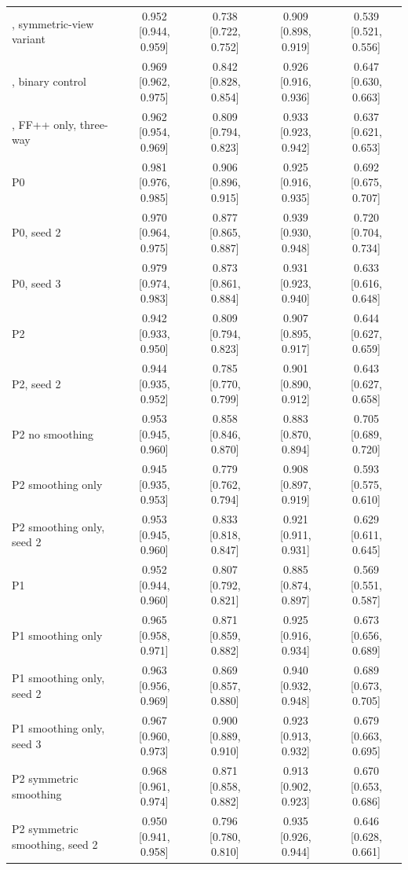 \begin{tabular}{@{}l cccc@{}}
\ours{}, symmetric-view variant & 0.952 [0.944, 0.959] & 0.738 [0.722, 0.752] & 0.909 [0.898, 0.919] & 0.539 [0.521, 0.556] \\
\ours{}, binary control & 0.969 [0.962, 0.975] & 0.842 [0.828, 0.854] & 0.926 [0.916, 0.936] & 0.647 [0.630, 0.663] \\
\ours{}, FF++ only, three-way & 0.962 [0.954, 0.969] & 0.809 [0.794, 0.823] & 0.933 [0.923, 0.942] & 0.637 [0.621, 0.653] \\
\quad P0 & 0.981 [0.976, 0.985] & 0.906 [0.896, 0.915] & 0.925 [0.916, 0.935] & 0.692 [0.675, 0.707] \\
\quad P0, seed 2 & 0.970 [0.964, 0.975] & 0.877 [0.865, 0.887] & 0.939 [0.930, 0.948] & 0.720 [0.704, 0.734] \\
\quad P0, seed 3 & 0.979 [0.974, 0.983] & 0.873 [0.861, 0.884] & 0.931 [0.923, 0.940] & 0.633 [0.616, 0.648] \\
\quad P2 & 0.942 [0.933, 0.950] & 0.809 [0.794, 0.823] & 0.907 [0.895, 0.917] & 0.644 [0.627, 0.659] \\
\quad P2, seed 2 & 0.944 [0.935, 0.952] & 0.785 [0.770, 0.799] & 0.901 [0.890, 0.912] & 0.643 [0.627, 0.658] \\
\quad P2 no smoothing & 0.953 [0.945, 0.960] & 0.858 [0.846, 0.870] & 0.883 [0.870, 0.894] & 0.705 [0.689, 0.720] \\
\quad P2 smoothing only & 0.945 [0.935, 0.953] & 0.779 [0.762, 0.794] & 0.908 [0.897, 0.919] & 0.593 [0.575, 0.610] \\
\quad P2 smoothing only, seed 2 & 0.953 [0.945, 0.960] & 0.833 [0.818, 0.847] & 0.921 [0.911, 0.931] & 0.629 [0.611, 0.645] \\
\quad P1 & 0.952 [0.944, 0.960] & 0.807 [0.792, 0.821] & 0.885 [0.874, 0.897] & 0.569 [0.551, 0.587] \\
\quad P1 smoothing only & 0.965 [0.958, 0.971] & 0.871 [0.859, 0.882] & 0.925 [0.916, 0.934] & 0.673 [0.656, 0.689] \\
\quad P1 smoothing only, seed 2 & 0.963 [0.956, 0.969] & 0.869 [0.857, 0.880] & 0.940 [0.932, 0.948] & 0.689 [0.673, 0.705] \\
\quad P1 smoothing only, seed 3 & 0.967 [0.960, 0.973] & 0.900 [0.889, 0.910] & 0.923 [0.913, 0.932] & 0.679 [0.663, 0.695] \\
\quad P2 symmetric smoothing & 0.968 [0.961, 0.974] & 0.871 [0.858, 0.882] & 0.913 [0.902, 0.923] & 0.670 [0.653, 0.686] \\
\quad P2 symmetric smoothing, seed 2 & 0.950 [0.941, 0.958] & 0.796 [0.780, 0.810] & 0.935 [0.926, 0.944] & 0.646 [0.628, 0.661] \\

\end{tabular}
